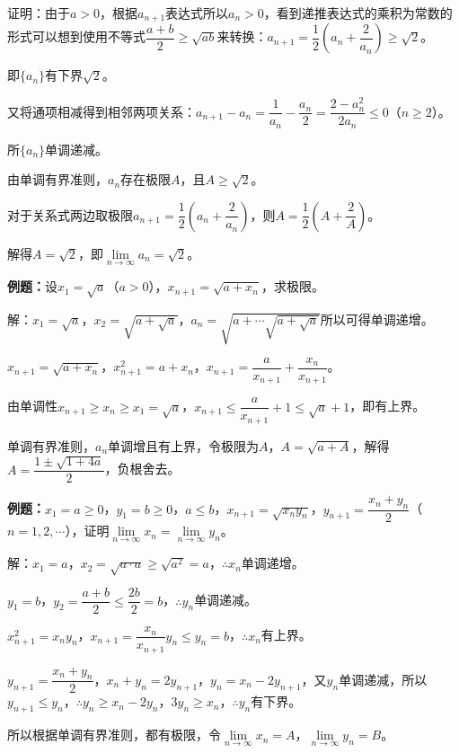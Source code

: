 证明：由于$a>0$，根据$a_{n+1}$表达式所以$a_n>0$，看到递推表达式的乘积为常数的形式可以想到使用不等式$\dfrac{a+b}{2}\geqslant\sqrt{ab}$来转换：$a_{n+1}=\dfrac{1}{2}\left(a_n+\dfrac{2}{a_n}\right)\geqslant\sqrt{2}$。

即$\{a_n\}$有下界$\sqrt{2}$。

又将通项相减得到相邻两项关系：$a_{n+1}-a_n=\dfrac{1}{a_n}-\dfrac{a_n}{2}=\dfrac{2-a_n^2}{2a_n}\leqslant0$（$n\geqslant2$）。

所$\{a_n\}$单调递减。

由单调有界准则，${a_n}$存在极限$A$，且$A\geqslant\sqrt{2}$。

对于关系式两边取极限$a_{n+1}=\dfrac{1}{2}\left(a_n+\dfrac{2}{a_n}\right)$，则$A=\dfrac{1}{2}\left(A+\dfrac{2}{A}\right)$。

解得$A=\sqrt{2}$，即$\lim\limits_{n\to\infty}a_n=\sqrt{2}$。

\textbf{例题：}设$x_1=\sqrt{a}$（$a>0$），$x_{n+1}=\sqrt{a+x_n}$，求极限。

解：$x_1=\sqrt{a}$，$x_2=\sqrt{a+\sqrt{a}}$，$a_n=\sqrt{a+\cdots\sqrt{a+\sqrt{a}}}$所以可得单调递增。

$x_{n+1}=\sqrt{a+x_n}$，$x_{n+1}^2=a+x_n$，$x_{n+1}=\dfrac{a}{x_{n+1}}+\dfrac{x_n}{x_{n+1}}$。

由单调性$x_{n+1}\geqslant x_n\geqslant x_1=\sqrt{a}$，$x_{n+1}\leqslant\dfrac{a}{x_{n+1}}+1\leqslant\sqrt{a}+1$，即有上界。

单调有界准则，$a_n$单调增且有上界，令极限为$A$，$A=\sqrt{a+A}$，解得$A=\dfrac{1\pm\sqrt{1+4a}}{2}$，负根舍去。

\textbf{例题：}$x_1=a\geqslant0$，$y_1=b\geqslant0$，$a\leqslant b$，$x_{n+1}=\sqrt{x_ny_n}$，$y_{n+1}=\dfrac{x_n+y_n}{2}$（$n=1,2,\cdots$），证明$\lim\limits_{n\to\infty}x_n=\lim\limits_{n\to\infty}y_n$。

解：$x_1=a$，$x_2=\sqrt{a\cdot a}\geqslant\sqrt{a^2}=a$，$\therefore x_n$单调递增。

$y_1=b$，$y_2=\dfrac{a+b}{2}\leqslant\dfrac{2b}{2}=b$，$\therefore y_n$单调递减。

$x_{n+1}^2=x_ny_n$，$x_{n+1}=\dfrac{x_n}{x_{n+1}}y_n\leqslant y_n=b$，$\therefore x_n$有上界。

$y_{n+1}=\dfrac{x_n+y_n}{2}$，$x_n+y_n=2y_{n+1}$，$y_n=x_n-2y_{n+1}$，又$y_n$单调递减，所以$y_{n+1}\leqslant y_n$，$\therefore y_n\geqslant x_n-2y_n$，$3y_n\geqslant x_n$，$\therefore y_n$有下界。

所以根据单调有界准则，都有极限，令$\lim\limits_{n\to\infty}x_n=A$，$\lim\limits_{n\to\infty}y_n=B$。

